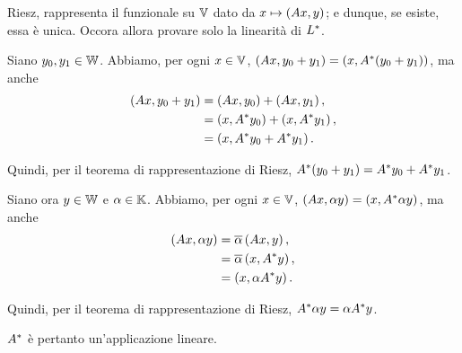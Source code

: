 Riesz, rappresenta il funzionale su $\mathbb{V}$ dato da
$x \mapsto \left ( A x , y \right )$; e dunque, se esiste, essa \`e
unica. Occora allora provare solo la linearit\`a di ${L}^*$.
\par Siano $y_0, y_1 \in \mathbb{W}$.
Abbiamo, per ogni $x \in \mathbb{V}$,
$\left ( A x , y_0 + y_1 \right )
= \left ( x , {A}^*(y_0 + y_1) \right )$, ma anche
\begin{align*}
  \left ( A x , y_0 + y_1 \right )
  &= \left ( A x , y_0 \right )
    + \left ( A x , y_1 \right ),\\
  &= \left ( x , {A}^*y_0 \right )
    + \left ( x , {A}^*y_1 \right ),\\
  &= \left ( x , {A}^*y_0
    + {A}^*y_1 \right ).
\end{align*}
\par Quindi, per il teorema di rappresentazione di Riesz,
${A}^*(y_0 + y_1)
= {A}^*y_0 + {A}^*y_1$.
\par Siano ora $y \in \mathbb{W}$ e $\alpha \in \mathbb{K}$.
Abbiamo, per ogni $x \in \mathbb{V}$,
$\left ( A x , \alpha y \right )
= \left ( x , {A}^* \alpha y \right )$,
ma anche
\begin{align*}
  \left ( A x , \alpha y \right )
  &= \overline{\alpha} \left ( A x , y \right ),\\
  &= \overline{\alpha}\left ( x , {A}^*y \right ),\\
  &= \left ( x , \alpha {A}^* y \right ).
\end{align*}
\par Quindi, per il teorema di rappresentazione di Riesz,
${A}^* \alpha y = \alpha {A}^* y$.
\par ${A}^*$ \`e pertanto un'applicazione lineare. \EndProof

